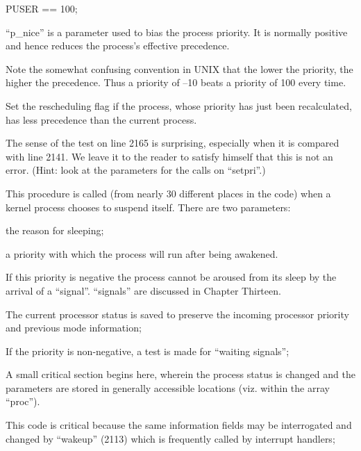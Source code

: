  \item[(2)] PUSER == 100;

 \item[(3)] ``p\_nice'' is a parameter used to
 bias the process priority. It is
 normally positive and hence
 reduces the process's effective
 precedence.
\ed
\ed

Note the somewhat confusing convention
in UNIX that the lower the priority,
the higher the precedence. Thus a
priority of --10 beats a priority of 100
every time.

\bd
\item[2165:] Set the rescheduling flag if the
 process, whose priority has just
 been recalculated, has less precedence than the current process.
\ed

The sense of the test on line 2165 is
surprising, especially when it is compared with line 2141. We leave it to
the reader to satisfy himself that this
is not an error. (Hint: look at the
parameters for the calls on ``setpri''.)



This procedure is called (from nearly
30 different places in the code) when a
kernel process chooses to suspend
itself. There are two parameters:

\bi
\item the reason for sleeping;

\item a priority with which the process
 will run after being awakened.
\ei

If this priority is negative the process cannot be aroused from its sleep
by the arrival of a ``signal''. ``signals''
are discussed in Chapter Thirteen.

\bd
\item[2070:] The current processor status is
saved to preserve the incoming
processor priority and previous
mode information;

\item[2072:] If the priority is non-negative,
a test is made for ``waiting signals'';

\item[2075:] A small critical section begins
here, wherein the process status
is changed and the parameters are
stored in generally accessible
locations (viz. within the array ``proc'').

This code is critical because the
same information fields may be
interrogated and changed by
``wakeup'' (2113) which is frequently called by interrupt
handlers;

